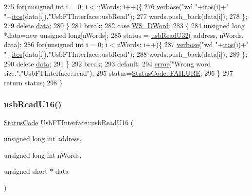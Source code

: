 \begin{DoxyCode}
275       \textcolor{keywordflow}{for}(\textcolor{keywordtype}{unsigned} \textcolor{keywordtype}{int} i = 0; i < nWords; i++)\{
276         \hyperlink{classObject_a83d2db2df682907ea1115ad721c1c4a1}{verbose}(\textcolor{stringliteral}{"wd "}+\hyperlink{Tools_8h_af330027dbdafb9a30768b3613c553e60}{itos}(i)+\textcolor{stringliteral}{" "}+\hyperlink{Tools_8h_af330027dbdafb9a30768b3613c553e60}{itos}(data[i]),\textcolor{stringliteral}{"UsbFTInterface::usbRead"});
277         words.push\_back(data[i]);
278       \};
279       \textcolor{keyword}{delete} \hyperlink{namespaceshell_a5ea2525995cedc3efd69ea8a7f034d1e}{data};
280     \}
281     \textcolor{keywordflow}{break};
282   \textcolor{keywordflow}{case} \hyperlink{classUsbFTInterface_a057387f452eaac094fb77ba09cf1cf2eae8012559bbaaae91ac6208ed7b3ffe89}{WS\_DWord}:
283     \{
284       \textcolor{keywordtype}{unsigned} \textcolor{keywordtype}{long} *data=\textcolor{keyword}{new} \textcolor{keywordtype}{unsigned} \textcolor{keywordtype}{long}[nWords];
285       status = \hyperlink{classUsbFTInterface_a7eadb8a94323fada4c72ed1c992792cc}{usbReadU32}( address, nWords, data);
286       \textcolor{keywordflow}{for}(\textcolor{keywordtype}{unsigned} \textcolor{keywordtype}{int} i = 0; i < nWords; i++)\{
287         \hyperlink{classObject_a83d2db2df682907ea1115ad721c1c4a1}{verbose}(\textcolor{stringliteral}{"wd "}+\hyperlink{Tools_8h_af330027dbdafb9a30768b3613c553e60}{itos}(i)+\textcolor{stringliteral}{" "}+\hyperlink{Tools_8h_af330027dbdafb9a30768b3613c553e60}{itos}(data[i]),\textcolor{stringliteral}{"UsbFTInterface::usbRead"});
288         words.push\_back(data[i]);
289       \};
290       \textcolor{keyword}{delete} \hyperlink{namespaceshell_a5ea2525995cedc3efd69ea8a7f034d1e}{data};
291     \}
292     \textcolor{keywordflow}{break};
293   \textcolor{keywordflow}{default}:
294     \hyperlink{classObject_a204a95f57818c0f811933917a30eff45}{error}(\textcolor{stringliteral}{"Wrong word size."},\textcolor{stringliteral}{"UsbFTInterface::read"});
295     status=\hyperlink{classStatusCode_a6f565cbeadc76d14c72f047e5e85eb4ba3da73d4c469762eb9d3c960368252b26}{StatusCode::FAILURE};
296   \}
297   \textcolor{keywordflow}{return} status;
298 \}
\end{DoxyCode}
\mbox{\label{classUsbFTInterface_ae17381a2ca14b9acac9faa10c3e430db}} 
\subsubsection{\texorpdfstring{usb\+Read\+U16()}{usbReadU16()}}
{\footnotesize\ttfamily \hyperlink{classStatusCode}{Status\+Code} Usb\+F\+T\+Interface\+::usb\+Read\+U16 (\begin{DoxyParamCaption}\item[{unsigned long int}]{address,  }\item[{unsigned long int}]{n\+Words,  }\item[{unsigned short $\ast$}]{data }\end{DoxyParamCaption})}



